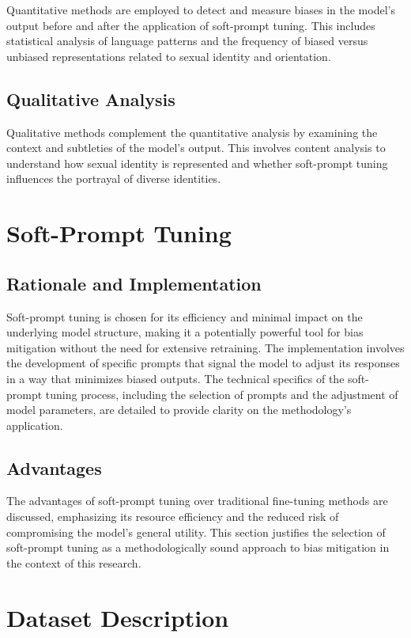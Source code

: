 Quantitative methods are employed to detect and measure biases in the model's output before and after the application of soft-prompt tuning. This includes statistical analysis of language patterns and the frequency of biased versus unbiased representations related to sexual identity and orientation.

\subsection{Qualitative Analysis}

Qualitative methods complement the quantitative analysis by examining the context and subtleties of the model's output. This involves content analysis to understand how sexual identity is represented and whether soft-prompt tuning influences the portrayal of diverse identities.

\section{Soft-Prompt Tuning}

\subsection{Rationale and Implementation}

Soft-prompt tuning is chosen for its efficiency and minimal impact on the underlying model structure, making it a potentially powerful tool for bias mitigation without the need for extensive retraining. The implementation involves the development of specific prompts that signal the model to adjust its responses in a way that minimizes biased outputs. The technical specifics of the soft-prompt tuning process, including the selection of prompts and the adjustment of model parameters, are detailed to provide clarity on the methodology's application.

\subsection{Advantages}

The advantages of soft-prompt tuning over traditional fine-tuning methods are discussed, emphasizing its resource efficiency and the reduced risk of compromising the model's general utility. This section justifies the selection of soft-prompt tuning as a methodologically sound approach to bias mitigation in the context of this research.


\section{Dataset Description}

